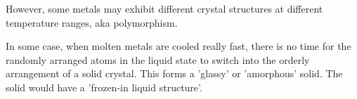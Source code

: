 However, some metals may exhibit different crystal structures at different temperature ranges, aka polymorphism. 

In some case, when molten metals are cooled really fast, there is no time for the randomly arranged atoms in the liquid state to switch into the orderly arrangement of a solid crystal. This forms a 'glassy' or 'amorphous' solid. The solid would have a 'frozen-in liquid structure'.

